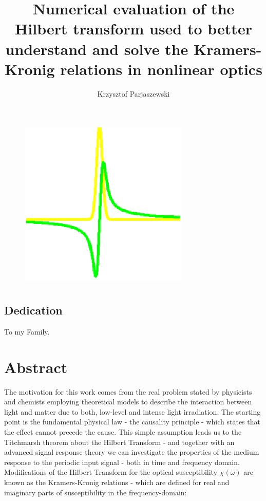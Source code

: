 \documentclass[12pt,twoside,a4paper]{article}
\title{Numerical evaluation of the Hilbert transform used to better understand 
and solve the Kramers-Kronig relations in nonlinear optics}
\author{Krzysztof Parjaszewski}
\date{}
\numberwithin{equation}{subsection}
\numberwithin{figure}{subsection}
\begin{document}

\maketitle


\begin{figure}[h]
  \begin{center}
    \includegraphics{img/title.png}
  \end{center}
\end{figure}


\section*{} \label{chap:preamble} 
\subsection*{Dedication} \label{chap:pre_dedication}


To my Family.


\section*{Abstract} \label{chap:abstract}

The motivation for this work comes from the real problem stated by physicists and chemists employing theoretical models to
describe the interaction between light and matter due to both, low-level and intense light irradiation. The starting point is the
fundamental physical law - the causality principle - which states that the effect cannot precede the cause. This simple assumption
leads us to the Titchmarsh theorem about the Hilbert Transform - and together with an advanced signal response-theory we can
investigate the properties of the medium response to the periodic input signal - both in time and frequency domain. Modifications
of the Hilbert Transform for the optical susceptibility $\chi (\omega )$ are known as the Kramers-Kronig relations - which are
defined for real and imaginary parts of susceptibility in the frequency-domain:
\end{document}
